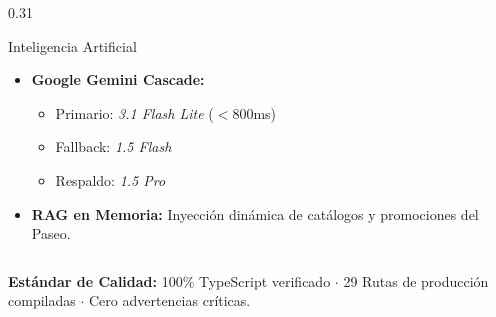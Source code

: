 \documentclass[aspectratio=169, 10pt]{beamer}
\begin{document}
\begin{frame}
\begin{columns}[T]
    \begin{column}{0.31\textwidth}
      \begin{exampleblock}{Inteligencia Artificial}
        \scriptsize
        \begin{itemize}\setlength\itemsep{0.25em}
          \item \textbf{Google Gemini Cascade:}
          \begin{itemize}\scriptsize
            \item Primario: \textit{3.1 Flash Lite} ($<$800ms)
            \item Fallback: \textit{1.5 Flash}
            \item Respaldo: \textit{1.5 Pro}
          \end{itemize}
          \item \textbf{RAG en Memoria:} Inyección dinámica de catálogos y promociones del Paseo.
        \end{itemize}
      \end{exampleblock}
    \end{column}
  \end{columns}

  \vskip 0.35cm
  \centering \scriptsize \color{AranjuezMuted}
  \textbf{Estándar de Calidad:} 100\% TypeScript verificado $\cdot$ 29 Rutas de producción compiladas $\cdot$ Cero advertencias críticas.
\end{frame}
\end{document}
